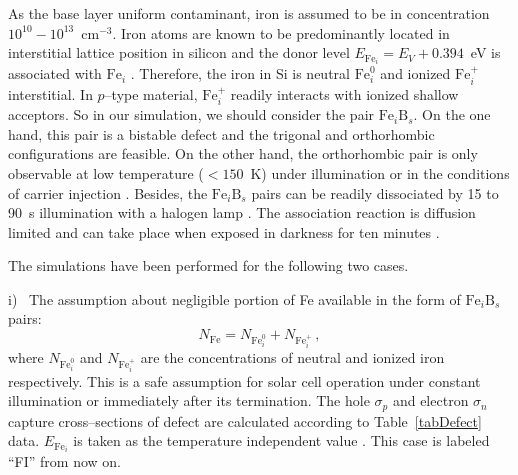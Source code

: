 \documentclass [sort&compress] {elsarticle}
\begin{document}
As the base layer uniform contaminant, iron is assumed to be in concentration $10^{10}-10^{13}$~cm$^{-3}$.
Iron atoms are known to be predominantly located in interstitial lattice position in silicon and
the donor level $E_{\mathrm{Fe}_i} = E_V+0.394$~eV is associated with $\mathrm{Fe}_i$ \cite{Rein2,MurphyJAP2011}.
Therefore, the iron in Si is neutral  $\mathrm{Fe}_i^0$ and ionized $\mathrm{Fe}_i^+$  interstitial.
In $p$--type material, $\mathrm{Fe}_i^+$ readily interacts with ionized shallow acceptors.
So in our simulation, we should consider the pair $\mathrm{Fe}_i\mathrm{B}_s$.
On the one hand, this pair is a bistable defect and the trigonal and orthorhombic configurations are feasible.
On the other hand, the orthorhombic pair is only observable at low temperature ($<150$~K) under illumination or in the conditions of carrier injection \cite{Narland,Sakauchi}.
Besides,  the $\mathrm{Fe}_i\mathrm{B}_s$ pairs can be readily dissociated by 15 to 90~s illumination with a halogen lamp \cite{FeB:Schmidt}.
The association reaction is diffusion limited and can take place when exposed in darkness for ten minutes \cite{FeB:kinetic}.

The  simulations have been performed for the following two cases.

\noindent
i)~
The assumption about negligible portion of Fe available  in the form of $\mathrm{Fe}_i\mathrm{B}_s$ pairs:
\begin{equation}
\label{eqN1}
    N_{\mathrm{Fe}}=N_{\mathrm{Fe}_i^0}+N_{\mathrm{Fe}_i^+} \,,
\end{equation}
where
$N_{\mathrm{Fe}_i^0}$ and $N_{\mathrm{Fe}_i^+}$ are the concentrations of  neutral and ionized iron respectively.
This is a safe assumption for solar cell operation under constant illumination or immediately after its termination.
The hole $\sigma_p$ and electron $\sigma_n$ capture cross--sections of defect are calculated according to Table~\ref{tabDefect} data.
$E_{\mathrm{Fe}_i}$ is taken as the temperature independent value \cite{Kohno}.
This case is labeled ``FI'' from now on.
\end{document}
